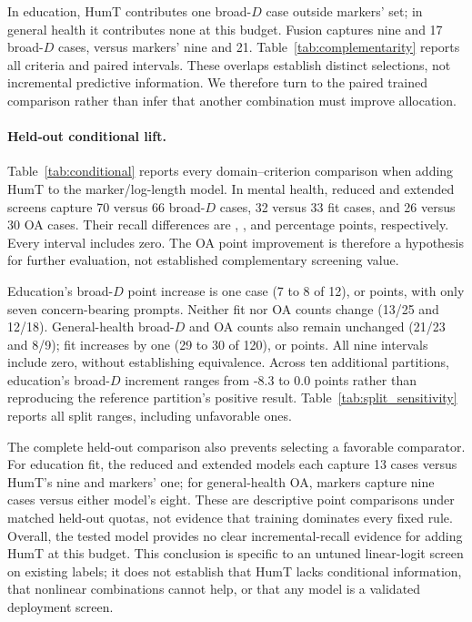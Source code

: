 \documentclass[manuscript,screen,review,anonymous]{acmart}
\begin{document}
In education, HumT contributes one broad-$D$ case outside markers' set; in general health it contributes none at this budget. Fusion captures nine and 17 broad-$D$ cases, versus markers' nine and 21. Table~\ref{tab:complementarity} reports all criteria and paired intervals. These overlaps establish distinct selections, not incremental predictive information. We therefore turn to the paired trained comparison rather than infer that another combination must improve allocation.

\paragraph{Held-out conditional lift.}
Table~\ref{tab:conditional} reports every domain--criterion comparison when adding HumT to the marker/log-length model. In mental health, reduced and extended screens capture 70 versus 66 broad-$D$ cases, 32 versus 33 fit cases, and 26 versus 30 OA cases. Their recall differences are \MHDConditional{}, \MHFConditional{}, and \MHOAConditional{} percentage points, respectively. Every interval includes zero. The OA point improvement is therefore a hypothesis for further evaluation, not established complementary screening value.


Education's broad-$D$ point increase is one case (7 to 8 of 12), or \EDDConditional{} points, with only seven concern-bearing prompts. Neither fit nor OA counts change (13/25 and 12/18). General-health broad-$D$ and OA counts also remain unchanged (21/23 and 8/9); fit increases by one (29 to 30 of 120), or \GHFConditional{} points. All nine intervals include zero, without establishing equivalence. Across ten additional partitions, education's broad-$D$ increment ranges from -8.3 to 0.0 points rather than reproducing the reference partition's positive result. Table~\ref{tab:split_sensitivity} reports all split ranges, including unfavorable ones.

The complete held-out comparison also prevents selecting a favorable comparator. For education fit, the reduced and extended models each capture 13 cases versus HumT's nine and markers' one; for general-health OA, markers capture nine cases versus either model's eight. These are descriptive point comparisons under matched held-out quotas, not evidence that training dominates every fixed rule. Overall, the tested model provides no clear incremental-recall evidence for adding HumT at this budget. This conclusion is specific to an untuned linear-logit screen on existing labels; it does not establish that HumT lacks conditional information, that nonlinear combinations cannot help, or that any model is a validated deployment screen.
\end{document}
